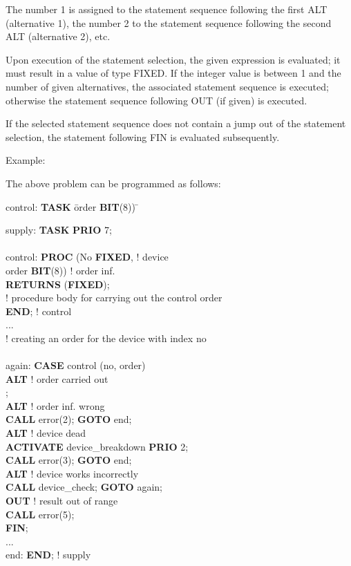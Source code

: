 The number 1 is assigned to the statement sequence following the first
ALT (alternative 1), the number 2 to the statement sequence following
the second ALT (alternative 2), etc.

Upon execution of the statement selection, the given expression is
evaluated; it must result in a value of type FIXED. If the integer value
is between 1 and the number of given alternatives, the associated
statement sequence is executed; otherwise the statement sequence
following OUT (if given) is executed.

If the selected statement sequence does not contain a jump out of the
statement selection, the statement following FIN is evaluated
subsequently.

Example:

The above problem can be programmed as follows:

\begin{tabbing}

control: \= {\bf TASK} \= order {\bf BIT}(8)) \x \= \kill

supply:  \> {\bf TASK} \> {\bf PRIO} 7;       \> \\
 \> \> \> \\
control: \> {\bf PROC} \> (No {\bf FIXED},    \> ! device \\
 \>             \> order {\bf BIT}(8)) \> ! order inf.\\
 \> {\bf RETURNS} ({\bf FIXED});   \>  \> \\
 \> ! procedure body for carrying out the control order \> \> \\
 \> {\bf END}; ! control \> \> \\
 \> ... \> \> \\
 \> ! creating an order for the device with index no \> \> \\
 \> \> \> \\
again:   \> {\bf CASE} \> control (no, order) \> \\
 \> {\bf ALT}   \> ! order carried out \> \\
 \>             \> ; \> \\
 \> {\bf ALT}   \> ! order inf. wrong \> \\
 \>             \> {\bf CALL} error(2); {\bf GOTO} end; \> \\
 \> {\bf ALT}   \> ! device dead \> \\
 \>             \> {\bf ACTIVATE} device\_breakdown {\bf PRIO} 2; \> \\
 \>             \> {\bf CALL} error(3); {\bf GOTO} end; \> \\
 \> {\bf ALT}   \> ! device works incorrectly \> \\
 \>             \> {\bf CALL} device\_check; {\bf GOTO} again; \> \\
 \> {\bf OUT}   \> ! result out of range \> \\
 \>             \> {\bf CALL} error(5); \> \\
 \> {\bf FIN}; \> \> \\
 \> ...         \> \> \\
end:     \> {\bf END}; \> ! supply \>
\end{tabbing}

